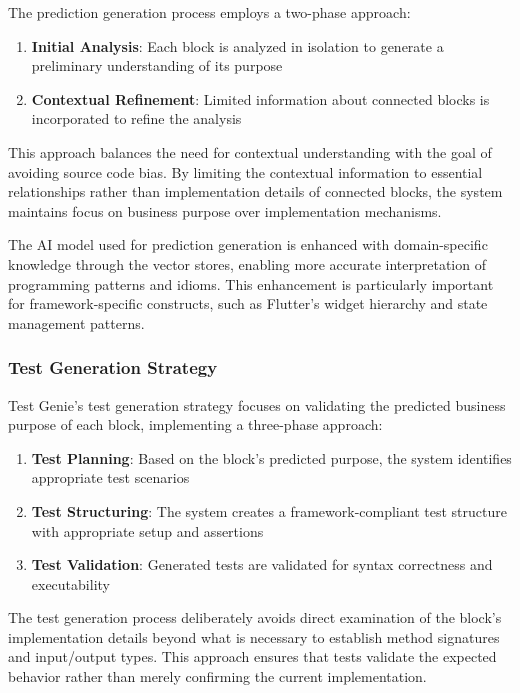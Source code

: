 \hspace{0.5cm}The prediction generation process employs a two-phase approach:

\begin{enumerate}
    \item \textbf{Initial Analysis}: Each block is analyzed in isolation to generate a preliminary understanding of its purpose
    \item \textbf{Contextual Refinement}: Limited information about connected blocks is incorporated to refine the analysis
\end{enumerate}

\hspace{0.5cm}This approach balances the need for contextual understanding with the goal of avoiding source code bias. By limiting the contextual information to essential relationships rather than implementation details of connected blocks, the system maintains focus on business purpose over implementation mechanisms.

\hspace{0.5cm}The AI model used for prediction generation is enhanced with domain-specific knowledge through the vector stores, enabling more accurate interpretation of programming patterns and idioms. This enhancement is particularly important for framework-specific constructs, such as Flutter's widget hierarchy and state management patterns.

\subsubsection{Test Generation Strategy}

\hspace{0.5cm}Test Genie's test generation strategy focuses on validating the predicted business purpose of each block, implementing a three-phase approach:

\begin{enumerate}
    \item \textbf{Test Planning}: Based on the block's predicted purpose, the system identifies appropriate test scenarios
    \item \textbf{Test Structuring}: The system creates a framework-compliant test structure with appropriate setup and assertions
    \item \textbf{Test Validation}: Generated tests are validated for syntax correctness and executability
\end{enumerate}

\hspace{0.5cm}The test generation process deliberately avoids direct examination of the block's implementation details beyond what is necessary to establish method signatures and input/output types. This approach ensures that tests validate the expected behavior rather than merely confirming the current implementation.

